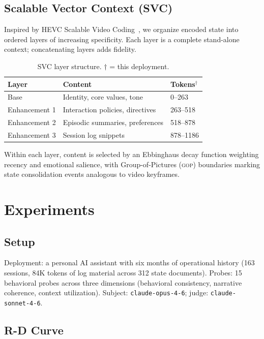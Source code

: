 \documentclass[10pt,twocolumn]{article}
\newcommand{\gop}{\textsc{gop}}
\begin{document}
\subsection{Scalable Vector Context (SVC)}

Inspired by HEVC Scalable Video Coding~\cite{sullivan2012}, we organize
encoded state into ordered layers of increasing specificity. Each layer
is a complete stand-alone context; concatenating layers adds fidelity.

\begin{table}[h]
\centering
\caption{SVC layer structure. $\dagger$ = this deployment.}
\label{tab:svc}
\small
\begin{tabular}{@{}lll@{}}
\toprule
Layer & Content & Tokens$^\dagger$ \\
\midrule
Base & Identity, core values, tone & 0--263 \\
Enhancement 1 & Interaction policies, directives & 263--518 \\
Enhancement 2 & Episodic summaries, preferences & 518--878 \\
Enhancement 3 & Session log snippets & 878--1186 \\
\bottomrule
\end{tabular}
\end{table}

Within each layer, content is selected by an Ebbinghaus decay function
weighting recency and emotional salience, with Group-of-Pictures
(\gop{}) boundaries marking state consolidation events analogous to
video keyframes.

\section{Experiments}
\label{sec:experiments}

\subsection{Setup}

Deployment: a personal AI assistant with six months of operational
history (163 sessions, 84K tokens of log material across 312 state
documents). Probes: 15 behavioral probes across three dimensions
(behavioral consistency, narrative coherence, context utilization).
Subject: \texttt{claude-opus-4-6}; judge: \texttt{claude-sonnet-4-6}.

\subsection{R-D Curve}
\end{document}
